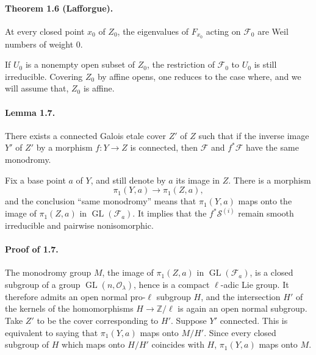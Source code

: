 \documentclass[11pt]{article}
\newcommand{\Z}{\mathbb{Z}}
\newcommand{\GL}{\operatorname{GL}}
\begin{document}
\paragraph{Theorem 1.6 (Lafforgue).}
At every closed point $x_0$ of $Z_0$, the eigenvalues of $F_{x_0}$ acting on $\mathcal F_0$ are Weil numbers of weight $0$.

If $U_0$ is a nonempty open subset of $Z_0$, the restriction of $\mathcal F_0$ to $U_0$ is still irreducible.
Covering $Z_0$ by affine opens, one reduces to the case where, and we will assume that, $Z_0$ is affine.

\paragraph{Lemma 1.7.}
There exists a connected Galois etale cover $Z'$ of $Z$ such that if the inverse image $Y'$ of $Z'$ by a morphism $f:Y\to Z$ is connected, then $\mathcal F$ and $f^*\mathcal F$ have the same monodromy.

Fix a base point $a$ of $Y$, and still denote by $a$ its image in $Z$.
There is a morphism
\[
 \pi_1(Y,a)\longrightarrow\pi_1(Z,a),
\]
and the conclusion ``same monodromy'' means that $\pi_1(Y,a)$ maps onto the image of $\pi_1(Z,a)$ in $\GL(\mathcal F_a)$.
It implies that the $f^*\mathcal S^{(i)}$ remain smooth irreducible and pairwise nonisomorphic.

\paragraph{Proof of 1.7.}
The monodromy group $M$, the image of $\pi_1(Z,a)$ in $\GL(\mathcal F_a)$, is a closed subgroup of a group $\GL(n,\mathcal O_\lambda)$, hence is a compact $\ell$-adic Lie group.
It therefore admits an open normal pro-$\ell$ subgroup $H$, and the intersection $H'$ of the kernels of the homomorphisms $H\to\Z/\ell$ is again an open normal subgroup.
Take $Z'$ to be the cover corresponding to $H'$.
Suppose $Y'$ connected.
This is equivalent to saying that $\pi_1(Y,a)$ maps onto $M/H'$.
Since every closed subgroup of $H$ which maps onto $H/H'$ coincides with $H$, $\pi_1(Y,a)$ maps onto $M$.
\end{document}
